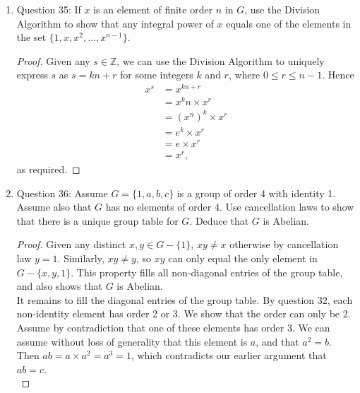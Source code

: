 \documentclass{article}
\begin{document}
\begin{enumerate}
\begin{enumerate}
\begin{proof}
          Since the $n$ elements are distinct, $G$ must have at least $n$
          elements.
        \end{proof}
      \item Question 35: If $x$ is an element of finite order $n$ in $G$,
        use the Division Algorithm to show that any integral power of $x$
        equals one of the elements in the set $\{1,x,x^2,\ldots,x^{n-1}\}$.
        \begin{proof}
          Given any $s\in\mathbb{Z}$, we can use the Division Algorithm to
          uniquely express $s$ as $s=kn+r$ for some integers $k$ and $r$,
          where $0\leq r\leq n-1$. Hence
          \begin{align*}
            x^s & = x^{kn+r} \\
                & = x^kn \times x^r \\
                & = (x^n)^k \times x^r \\
                & = e^k \times x^r \\
                & = e \times x^r \\
                & = x^r,
          \end{align*}
          as required.
        \end{proof}
      \item Question 36: Assume $G=\{1,a,b,c\}$ is a group of order 4 with
        identity 1. Assume also that $G$ has no elements of order 4. Use
        cancellation laws to show that there is a unique group table for
        $G$. Deduce that $G$ is Abelian.
        \begin{proof}
          Given any distinct $x,y\in G-\{1\}$, $xy\neq x$ otherwise by
          cancellation law $y=1$. Similarly, $xy\neq y$, so $xy$ can only
          equal the only element in $G-\{x,y,1\}$. This property fills all
          non-diagonal entries of the group table, and also shows that $G$
          is Abelian. \\

          It remains to fill the diagonal entries of the group table. By
          question 32, each non-identity element has order 2 or 3. We show
          that the order can only be 2. Assume by contradiction that one of
          these elements has order 3. We can assume without loss of
          generality that this element is $a$, and that $a^2=b$. Then
          $ab=a\times a^2 = a^3 = 1$, which contradicts our earlier
          argument that $ab=c$. \\


\end{proof}
\end{enumerate}
\end{enumerate}
\end{document}
